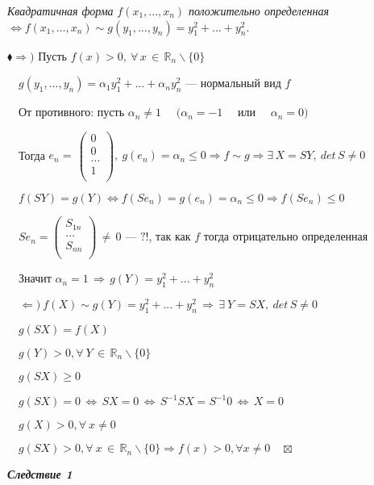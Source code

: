 \documentclass[a4paper, 12pt]{report}
\begin{document}
	\textit{Квадратичная форма} $f(x_1,...,x_n)$\textit{ положительно определенная} $\Longleftrightarrow f(x_1, ..., x_n) \sim g(y_1, ..., y_n)=y_1^2+...+y_n^2$.
	\par\bigskip
	$\blacklozenge \Rightarrow)$ Пусть $f(x)>0,\ \forall\, x\, \in \, \mathbb{R}_n \backslash \{0\} $\par
	$\quad g(y_1,...,y_n)=\alpha_1 y_1^2+...+\alpha_n y_n^2$ --- нормальный вид $f$\par
	$\quad$От противного: пусть $\alpha_n \ne 1 \quad $ $(\alpha_n=-1 \quad$ или $\quad \alpha_n=0)$\par
	$\quad$Тогда $e_n=\, \begin{pmatrix}
		0\\
		0\\
		...\\
		1\\
	\end{pmatrix},\ g(e_n)=\alpha_n \leqslant 0\Rightarrow f \sim g\Rightarrow \exists \, X=SY,\ det \, S \ne 0$\par
	$\quad f(SY)=g(Y) \Longleftrightarrow f(S e_n)=g(e_n)=\alpha_n \leqslant 0\Rightarrow f(S e_n) \leqslant 0$\par
	$\quad S e_n = \begin{pmatrix}
		S_{1n}\\
		...\\
		S_{nn}\\
	\end{pmatrix} \, \ne \, 0$ --- $?!$, так как $f$ тогда отрицательно определенная\par
	$\quad$Значит $\alpha_n=1 \, \Rightarrow \, g(Y)=y_1^2+...+y_n^2$
	\par\bigskip
	$\quad \Leftarrow )\ f(X) \sim g(Y)=y_1^2+...+y_n^2 \, \Rightarrow \, \exists\ Y=SX,\ det\, S \ne 0$\par
	$\quad g(SX)=f(X)$\par
	$\quad g(Y)>0,\forall\ Y\, \in\, \mathbb{R}_n\backslash \{0\} $\par
	$\quad g(SX) \geqslant 0$\par
	$\quad g(SX)=0 \, \Longleftrightarrow \, SX=0 \, \Longleftrightarrow \, S^{-1}SX=S^{-1} 0 \, \Longleftrightarrow \, X=0$\par
	$\quad g(X)>0, \forall\ x\ne 0$\par
	$\quad g(SX)>0, \forall\ x \, \in \, \mathbb{R}_n \backslash \{0\} \Rightarrow f(x)>0, \forall x \ne 0 \quad \boxtimes$
	\par \bigskip
	\textit{\textbf{Следствие 1}}\par
\end{document}
